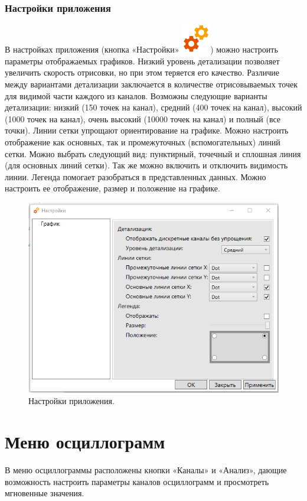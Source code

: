 \documentclass[a4paper,12pt]{article}
\begin{document}
\subsubsection*{\hspace{.5cm} Настройки приложения} 
\hspace{.5cm} В настройках приложения (кнопка «Настройки» \includegraphics[width=4ex]{image/Services-48.png}) можно настроить параметры отображаемых графиков.  
Низкий уровень детализации позволяет увеличить скорость отрисовки, но при этом теряется его качество. Различие между вариантами детализации заключается в количестве отрисовываемых точек для видимой части каждого из каналов. Возможны следующие варианты детализации: низкий (150 точек на канал), средний (400 точек на канал), высокий (1000 точек на канал), очень высокий (10000 точек на канал) и полный (все точки).  
Линии сетки упрощают ориентирование на графике. Можно настроить отображение как основных, так и промежуточных (вспомогательных) линий сетки. Можно выбрать следующий вид: пунктирный, точечный и сплошная линия (для основных линий сетки). Так же можно включить и отключить видимость линии.  
Легенда помогает разобраться в представленных данных. Можно настроить ее отображение, размер и положение на графике. 
\begin{figure}[h] 
\centering 
\includegraphics[width=65ex]{image/Screenshot_5.png} 
\caption{Настройки приложения.} 
\end{figure} 
 
 
\section*{\hspace{.5cm} Меню осциллограмм } 
\hspace{.5cm} В меню осциллограммы расположены кнопки «Каналы» и «Анализ», дающие возможность настроить параметры каналов осциллограмм и просмотреть мгновенные значения.  
 
\end{document}
